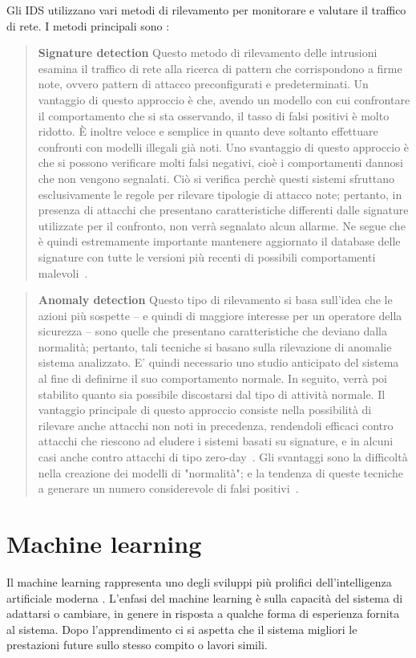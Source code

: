 \documentclass[../main.tex]{subfiles}
\begin{document}
Gli IDS utilizzano vari metodi di rilevamento per monitorare e valutare il traffico di rete. I metodi principali sono \cite{IDS}:

\begin{verse}
				\textbf{Signature detection} Questo metodo di rilevamento delle intrusioni esamina il traffico di rete alla ricerca di pattern che corrispondono a firme note, ovvero pattern di attacco preconfigurati e predeterminati. Un vantaggio di questo approccio è che, avendo un modello con cui confrontare il comportamento che si sta osservando, il tasso di falsi positivi è molto ridotto. È inoltre veloce e semplice in quanto deve soltanto effettuare confronti con modelli illegali già noti.
				Uno svantaggio di questo approccio è che si possono verificare molti falsi negativi, cioè i comportamenti dannosi che non vengono segnalati. Ciò si verifica perchè questi sistemi sfruttano esclusivamente le regole per rilevare tipologie di attacco note; pertanto, in presenza di attacchi che presentano caratteristiche differenti dalle signature utilizzate per il confronto, non verrà segnalato alcun allarme. Ne segue che è quindi estremamente importante mantenere aggiornato il database delle signature con tutte le versioni più recenti di possibili comportamenti malevoli~\cite{snort}.
\end{verse}

\begin{verse}
				\textbf{Anomaly detection} Questo tipo di rilevamento si basa sull'idea che le azioni più sospette -- e quindi di maggiore interesse per un operatore della sicurezza -- sono quelle che presentano caratteristiche che deviano dalla normalità; pertanto, tali tecniche si basano sulla rilevazione di anomalie sistema analizzato. E' quindi necessario uno studio anticipato del sistema al fine di definirne il suo comportamento normale. In seguito, verrà poi stabilito quanto sia possibile discostarsi dal tipo di attività normale. 
				Il vantaggio principale di questo approccio consiste nella possibilità di rilevare anche attacchi non noti in precedenza, rendendoli efficaci contro attacchi che riescono ad eludere i sistemi basati su signature, e in alcuni casi anche contro attacchi di tipo zero-day~\cite{zerodaydef}.
				Gli svantaggi sono la difficoltà nella creazione dei modelli di "normalità"; e la tendenza di queste tecniche a generare un numero considerevole di falsi positivi~\cite{suricatadef}.
\end{verse}

\section{Machine learning}
Il machine learning rappresenta uno degli sviluppi più prolifici dell'intelligenza artificiale moderna \cite{compIntelligence}. L'enfasi del machine learning è sulla capacità del sistema di adattarsi o cambiare, in genere in risposta a qualche forma di esperienza fornita al sistema. Dopo l'apprendimento ci si aspetta che il sistema migliori le prestazioni future sullo stesso compito o lavori simili.
\end{document}

